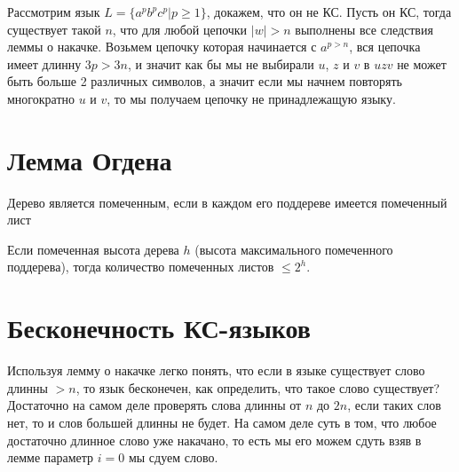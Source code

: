 Рассмотрим язык $L = \{a^pb^pc^p | p \ge 1\}$, докажем, что он не КС. Пусть он КС, тогда существует такой $n$, что для любой цепочки $|w| > n$ выполнены
все следствия леммы о накачке. Возьмем цепочку которая начинается с $a^{p>n}$, вся цепочка имеет длинну $3p > 3n$, и значит как бы мы не выбирали $u$, $z$ и
$v$ в $uzv$ не может быть больше 2 различных символов, а значит если мы начнем повторять многократно $u$ и $v$, то мы получаем цепочку не принадлежащую языку.

\section{Лемма Огдена}

\begin{Def}
Дерево является помеченным, если в каждом его поддереве имеется помеченный лист
\end{Def}

Если помеченная высота дерева $h$ (высота максимального помеченного поддерева), тогда количество помеченных листов $\le 2^h$.

\section{Бесконечность КС-языков}

Используя лемму о накачке легко понять, что если в языке существует слово длинны $>n$, то язык бесконечен, как определить, что такое слово существует? Достаточно
на самом деле проверять слова длинны от $n$ до $2n$, если таких слов нет, то и слов большей длинны не будет. На самом деле суть в том, что любое достаточно длинное
слово уже накачано, то есть мы его можем сдуть взяв в лемме параметр $i = 0$ мы сдуем слово.